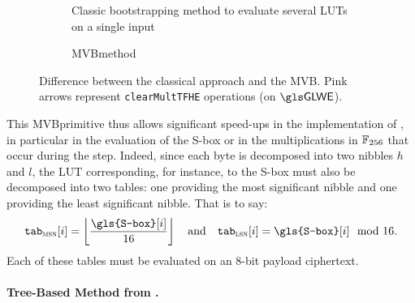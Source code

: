 \begin{figure}
	\centering
	\begin{subfigure}[t]{\linewidth}
		\centering
		\mvbFigureA %
		\caption{Classic bootstrapping method to evaluate several LUTs on a single input}
		\label{fig:mvbA}
	\end{subfigure}
	
	\vspace{1.5em} %
	
	\begin{subfigure}[t]{\textwidth}
		\centering
		\mvbFigureB %
		\caption{\gls{MVB}method}
		\label{fig:mvbB}
	\end{subfigure}
	
	\caption{Difference between the classical approach and the MVB. Pink arrows represent \texttt{clearMultTFHE} operations (on $\GLWE$).}
	\label{fig:mvb}
\end{figure}

This \gls{MVB}primitive thus allows significant speed-ups in the implementation of \cite{DBLP:conf/wahc/TramaCBS23}, in particular in the evaluation of the \gls{S-box} or in the multiplications in $\mathbb{F}_{256}$ that occur during the \MixColumns step. Indeed, since each byte is decomposed into two nibbles $h$ and $l$, the \gls{LUT} corresponding, for instance, to the \gls{S-box} must also be decomposed into two tables: one providing the most significant nibble and one providing the least significant nibble. That is to say: 
$$
\texttt{tab}_{\textsc{msn}}[i] = \left\lfloor \frac{\texttt{\gls{S-box}}[i]}{16} \right\rfloor \quad \text{and} \quad \texttt{tab}_{\textsc{lsn}}[i] = \texttt{\gls{S-box}}[i] \mod 16.
$$
Each of these tables must be evaluated on an 8-bit payload ciphertext. 


\paragraph{Tree-Based Method from \cite{DBLP:conf/wahc/TramaCBS23}.}
\label{prim:tbb}

